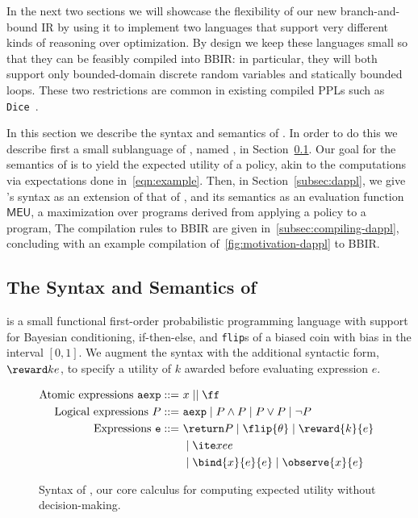 In the next two sections we will showcase the flexibility of our new
branch-and-bound IR by using it to implement two languages that support
very different kinds of reasoning over optimization.  By design we keep these
languages small so that they can be feasibly compiled into BBIR: in particular,
they will both support only bounded-domain discrete random variables and
statically bounded loops. These two restrictions are common in existing
compiled PPLs such as \texttt{Dice}~\citep{holtzen2020scaling}.

In this section we describe the syntax and semantics of \dappl{}.
In order to do this we describe first a small sublanguage of \dappl{},
named \util{}, in Section~\ref{subsec:util}.
Our goal for the semantics of \util{} is to yield the expected utility
of a policy, akin to the computations
via expectations done
in~\cref{eqn:example}.
Then, in Section~\ref{subsec:dappl},
we give \dappl{}'s syntax as an extension of that of \util{},
and its semantics as an evaluation function $\mathsf{MEU}$, a maximization
over \util{} programs derived from
applying a policy to a \dappl{} program,
The compilation rules to BBIR are given in~\cref{subsec:compiling-dappl},
concluding with an example compilation of~\cref{fig:motivation-dappl} to BBIR.


\subsection{The Syntax and Semantics of~\util}\label{subsec:util}

\util{} is a small functional first-order probabilistic programming language
with support for Bayesian conditioning, if-then-else,
and \texttt{flip}s of a biased coin with bias in the interval $[0,1]$.
We augment the syntax with the additional syntactic form, $\reward k e$,
to specify a utility of $k$ awarded before evaluating expression $e$.

\begin{wrapfigure}{r}{0.6\linewidth}
  \begin{mdframed}
  {\footnotesize\begin{align*}
    \text{Atomic expressions } \texttt{aexp} ::= \ & x \mid \tt \mid \ff &\\
    \text{Logical expressions } P ::= \ & \texttt{aexp} \mid P \land P \mid P \lor P \mid \neg P &\\
    \text{Expressions } \texttt{e} ::=\ & \return P  \mid \flip{\theta} \mid  \reward{k}{e} &\\
    &\mid  \ite x e e &\\ &\mid \bind{x}{e}{e} \mid \observe{x}{e} &
  \end{align*}}
  \end{mdframed}
  \caption{Syntax of \util{}, our core calculus for computing expected utility without decision-making.}
  \label{fig: util syntax}
\end{wrapfigure}

